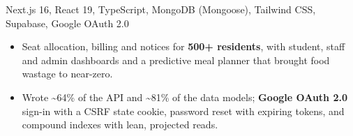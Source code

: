 {}
{Next.js 16, React 19, TypeScript, MongoDB (Mongoose), Tailwind CSS, Supabase, Google OAuth 2.0}
{\begin{itemize}
  \item Seat allocation, billing and notices for \textbf{500+ residents}, with student, staff and admin dashboards and a predictive meal planner that brought food wastage to near-zero.
  \item Wrote \textasciitilde64\% of the API and \textasciitilde81\% of the data models; \textbf{Google OAuth 2.0} sign-in with a CSRF state cookie, password reset with expiring tokens, and compound indexes with lean, projected reads.
\end{itemize}}
